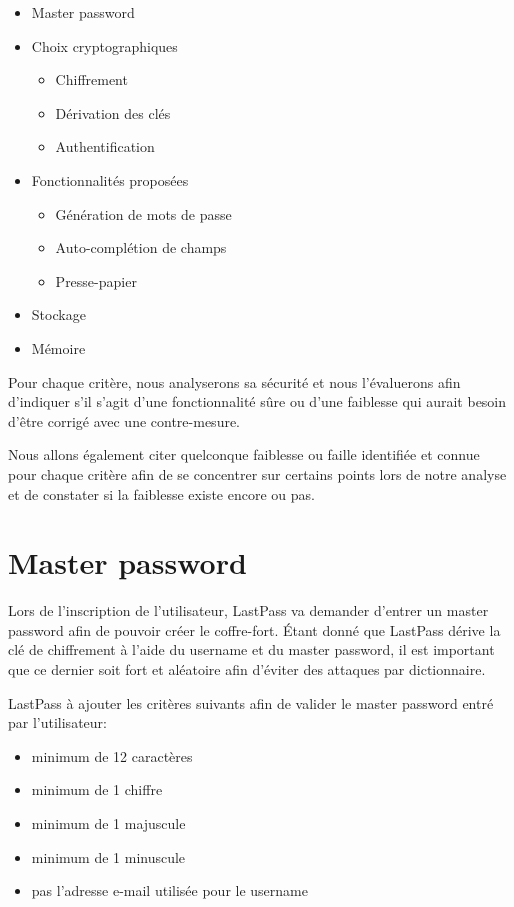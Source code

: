 \begin{itemize}
	\item Master password
	\item Choix cryptographiques
	\begin{itemize}
		\item Chiffrement
		\item Dérivation des clés
		\item Authentification
	\end{itemize}
	\item Fonctionnalités proposées
	\begin{itemize}
		\item Génération de mots de passe
		\item Auto-complétion de champs
		\item Presse-papier
	\end{itemize}
	\item Stockage
	\item Mémoire
\end{itemize}

Pour chaque critère, nous analyserons sa sécurité et nous l'évaluerons afin d'indiquer s'il s'agit d'une fonctionnalité sûre ou d'une faiblesse qui aurait besoin d'être corrigé avec une contre-mesure.

Nous allons également citer quelconque faiblesse ou faille identifiée et connue pour chaque critère afin de se concentrer sur certains points lors de notre analyse et de constater si la faiblesse existe encore ou pas.

\section{Master password}
Lors de l'inscription de l'utilisateur, LastPass va demander d'entrer un master password afin de pouvoir créer le coffre-fort. Étant donné que LastPass dérive la clé de chiffrement à l'aide du username et du master password, il est important que ce dernier soit fort et aléatoire afin d'éviter des attaques par dictionnaire. 

LastPass à ajouter les critères suivants afin de valider le master password entré par l'utilisateur:
\begin{itemize}
	\item minimum de 12 caractères
	\item minimum de 1 chiffre
	\item minimum de 1 majuscule
	\item minimum de 1 minuscule
	\item pas l'adresse e-mail utilisée pour le username
\end{itemize}

